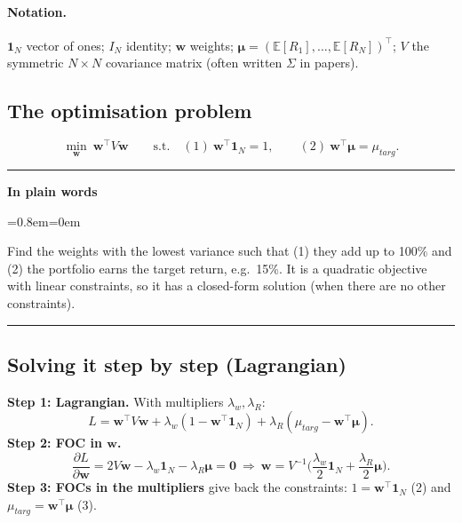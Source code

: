 \documentclass[11pt,a4paper]{report}
\newenvironment{notebox}[1]
  {\par\medskip\Needspace{6\baselineskip}\noindent\rule{\linewidth}{0.4pt}\par\nopagebreak
   \noindent\textbf{#1}\par\nopagebreak
   \begin{list}{}{\leftmargin=0.8em\rightmargin=0em\topsep=2pt}\item[]}
  {\end{list}\nopagebreak\noindent\rule{\linewidth}{0.4pt}\par\medskip}
\newenvironment{plainbox}{\begin{notebox}{In plain words}}{\end{notebox}}
\newcommand{\E}{\mathbb{E}}
\newcommand{\one}{\mathbf{1}_N}
\newcommand{\w}{\bm{w}}
\newcommand{\T}{^{\top}}
\newcommand{\mub}{\bm{\mu}}
\begin{document}
\paragraph{Notation.} $\one$ vector of ones; $I_N$ identity; $\w$ weights;
$\mub=(\E[R_1],\dots,\E[R_N])\T$; $V$ the symmetric $N\times N$ covariance
matrix (often written $\Sigma$ in papers).

\subsection{The optimisation problem}
\[
\min_{\w}\ \w\T V\w\qquad\text{s.t.}\quad (1)\ \w\T\one=1,\qquad (2)\ \w\T\mub=\mu_{targ}.
\]
\begin{plainbox}
Find the weights with the lowest variance such that (1) they add up to 100\% and
(2) the portfolio earns the target return, e.g.\ 15\%. It is a quadratic
objective with linear constraints, so it has a closed-form solution (when there
are no other constraints).
\end{plainbox}

\subsection{Solving it step by step (Lagrangian)}
\textbf{Step 1: Lagrangian.} With multipliers $\lambda_w,\lambda_R$:
\[
L=\w\T V\w+\lambda_w(1-\w\T\one)+\lambda_R(\mu_{targ}-\w\T\mub).
\]
\textbf{Step 2: FOC in $\w$.}
\[
\frac{\partial L}{\partial\w}=2V\w-\lambda_w\one-\lambda_R\mub=\bm 0
\ \Rightarrow\
\w=V^{-1}\Big(\frac{\lambda_w}{2}\one+\frac{\lambda_R}{2}\mub\Big). \tag{1}
\]
\textbf{Step 3: FOCs in the multipliers} give back the constraints:
$1=\w\T\one$ (2) and $\mu_{targ}=\w\T\mub$ (3).
\end{document}
